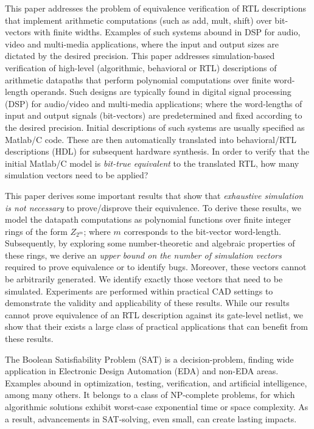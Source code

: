 This paper addresses the problem of equivalence verification of RTL
descriptions that implement arithmetic computations (such as {\sc add,
mult, shift}) over bit-vectors with finite widths. Examples of such
systems abound in DSP for audio, video and multi-media applications,
where the input and output sizes are dictated by the desired
precision. 
This paper addresses simulation-based verification of high-level 
(algorithmic, behavioral or RTL) descriptions of arithmetic datapaths 
that perform polynomial computations over finite word-length
operands. Such designs are typically found in digital signal
processing (DSP) for audio/video and multi-media applications; where
the word-lengths of input and output signals (bit-vectors) are 
predetermined and fixed according to the desired precision. Initial 
descriptions of such systems are usually specified as Matlab/C
code. These are then automatically translated into behavioral/RTL
descriptions (HDL) for subsequent hardware synthesis. In order to
verify that the initial Matlab/C model is {\it bit-true equivalent} to
the translated RTL, how many simulation vectors need to be applied? 

This paper derives some important results that show that {\it exhaustive
simulation is not necessary} to prove/disprove their equivalence. To
derive these results, we model the datapath computations as polynomial
functions over finite integer rings of the form $Z_{2^m}$; where $m$
corresponds to the bit-vector word-length. Subsequently, by exploring
some number-theoretic and algebraic properties of these rings, 
we derive an {\it upper bound on the number of simulation vectors}
required to prove equivalence or to identify bugs. Moreover, these
vectors cannot be arbitrarily generated.  We identify exactly those
vectors that need to be simulated. Experiments are performed within 
practical CAD settings to demonstrate the validity and applicability
of these results. While our results cannot prove equivalence of an RTL
description against its gate-level netlist, we show that their exists
a large class of practical applications that can benefit from these
results.  


The Boolean Satisfiability Problem (SAT) is a %
decision-problem, finding wide application in Electronic
Design Automation (EDA) and non-EDA areas.  Examples abound in optimization,
testing, verification, and artificial intelligence, among many others.
It belongs to a class of NP-complete
problems, for which algorithmic solutions exhibit worst-case exponential time
or space complexity.  
As a result, advancements in SAT-solving, even small, can create lasting impacts.

